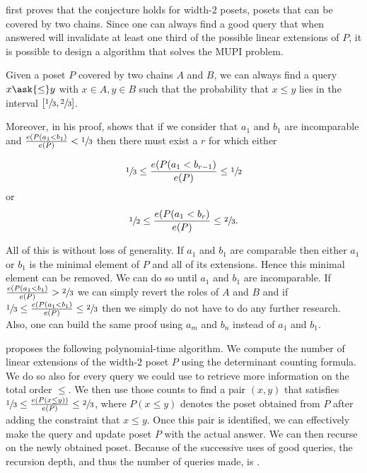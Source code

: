 \citet*{linial:1984} first proves that the \onethirdtwothird conjecture holds
for width-\(2\) posets, \ie posets that can be covered by two chains. Since one
can always find a good query that when answered will invalidate at
least one third of the possible linear extensions of \(P\), it is possible to design a
 algorithm that solves the MUPI problem.

\begin{theorem}
Given a poset \(P\) covered by two chains \(A\) and \(B\), we can always find
a query \(x \ask{\le} y\) with \(x \in A, y \in B\) such that the probability
that \(x \le y\) lies in the interval \([\sfrac{1}{3}, \sfrac{2}{3}]\).
\end{theorem}

Moreover, in his proof, \citet*{linial:1984} shows that if we consider that \(
a_1\) and \(b_1\) are incomparable and \(\frac{e(P(a_1 < b_1)}{e(P)} <
\sfrac{1}{3}\) then there must exist a \(r\) for which either

\begin{displaymath}
\sfrac{1}{3} \le \frac{e(P(a_1 < b_{r-1})}{e(P)} \le \sfrac{1}{2}
\end{displaymath}
or
\begin{displaymath}
\sfrac{1}{2} \le \frac{e(P(a_1 < b_{r})}{e(P)} \le \sfrac{2}{3}.
\end{displaymath}

All of this is without loss of generality. If \(a_1\) and \(b_1\) are
comparable then either \(a_1\) or \(b_1\) is the minimal element of \(P\) and
all of its extensions. Hence this minimal element can be removed. We can do so
until \(a_1\) and \(b_1\) are incomparable. If \(\frac{e(P(a_1 < b_1)}{e(P)} >
\sfrac{2}{3}\) we can simply revert the roles of \(A\) and \(B\) and if
\(\sfrac{1}{3} \le \frac{e(P(a_1 < b_1)}{e(P)} \le \sfrac{2}{3}\) then we
simply do not have to do any further research. Also, one can build the same
proof using \(a_m\) and \(b_n\) instead of \(a_1\) and \(b_1\).

\citet*{linial:1984} proposes the following polynomial-time algorithm. We
compute the number of linear extensions of the width-\(2\) poset \(P\) using
the determinant counting formula. We do so also for every query we could use to
retrieve more information on the total order \(\le\). We then use those counts
to find a pair \((x,y)\) that satisfies \(\sfrac{1}{3} \le \frac{e(P(x \le
y))}{e(P)} \le \sfrac{2}{3}\), where \(P(x \le y)\) denotes the poset obtained
from \(P\) after adding the constraint that \(x \le y\). Once this pair is
identified, we can effectively make the query and update poset \(P\) with the
actual answer. We can then recurse on the newly obtained poset. Because of the
successive uses of good queries, the recursion depth, and thus the number of
queries made, is .

